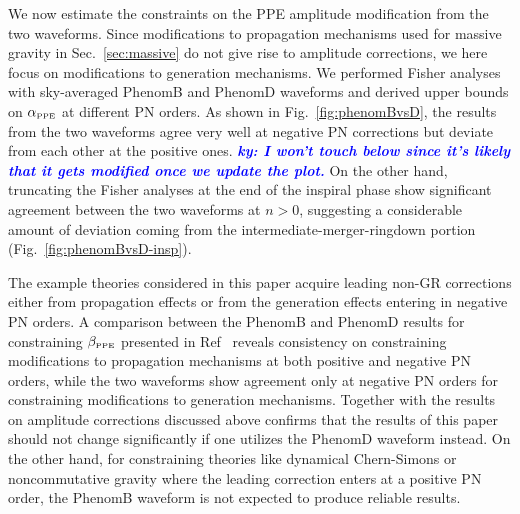 \documentclass[prd,twocolumn,nofootinbib]{revtex4-1}
\newcommand{\PPE}{{\mbox{\tiny PPE}}}
\newcommand{\ky}[1]{\textcolor{blue}{\it{\textbf{ky: #1}}} }
\begin{document}
We now estimate the constraints on the PPE amplitude modification from the two waveforms. Since modifications to propagation mechanisms used for massive gravity in Sec.~\ref{sec:massive} do not give rise to amplitude corrections, we here focus on modifications to generation mechanisms. We performed Fisher analyses with sky-averaged PhenomB and PhenomD waveforms and derived upper bounds on $\alpha_{\PPE}$ at different PN orders. As shown in Fig.~\ref{fig:phenomBvsD}, the results from the two waveforms agree very well at negative PN corrections but deviate from each other at the positive ones. \ky{I won't touch below since it's likely that it gets modified once we update the plot.}
On the other hand, truncating the Fisher analyses at the end of the inspiral phase show significant agreement between the two waveforms at $n>0$, suggesting a considerable amount of deviation coming from the intermediate-merger-ringdown portion (Fig.~\ref{fig:phenomBvsD-insp}).

The example theories considered in this paper acquire leading non-GR corrections either from propagation effects or from the generation effects entering in negative PN orders. A comparison between the PhenomB and PhenomD results for constraining $\beta_{\PPE}$ presented in Ref~\cite{Yunes:2016jcc} reveals consistency on constraining modifications to propagation mechanisms at both positive and negative PN orders, while the two waveforms show agreement only at negative PN orders for constraining modifications to generation mechanisms. Together with the results on amplitude corrections discussed above confirms that the results of this paper should not change significantly if one utilizes the PhenomD waveform instead. On the other hand, for constraining theories like dynamical Chern-Simons or noncommutative gravity where the leading correction enters at a positive PN order, the PhenomB waveform is not expected to produce reliable results.




\end{document}
